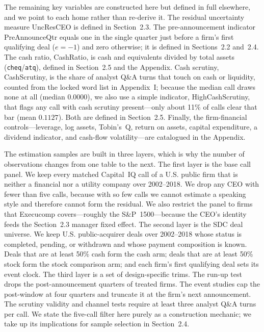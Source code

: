 The remaining key variables are constructed here but defined in full elsewhere, and we point to each home rather than re-derive it. The residual uncertainty measure UncResCEO is defined in Section~2.3. The pre-announcement indicator PreAnnounceQtr equals one in the single quarter just before a firm's first qualifying deal ($e=-1$) and zero otherwise; it is defined in Sections~2.2 and~2.4. The cash ratio, CashRatio, is cash and equivalents divided by total assets (\texttt{cheq}/\texttt{atq}), defined in Section~2.5 and the Appendix. Cash scrutiny, CashScrutiny, is the share of analyst Q\&A turns that touch on cash or liquidity, counted from the locked word list in Appendix~I; because the median call draws none at all (median $0.0000$), we also use a simple indicator, HighCashScrutiny, that flags any call with cash scrutiny present---only about 11\% of calls clear that bar (mean $0.1127$). Both are defined in Section~2.5. Finally, the firm-financial controls---leverage, log assets, Tobin's~Q, return on assets, capital expenditure, a dividend indicator, and cash-flow volatility---are catalogued in the Appendix.

The estimation samples are built in three layers, which is why the number of observations changes from one table to the next. The first layer is the base call panel. We keep every matched Capital~IQ call of a U.S. public firm that is neither a financial nor a utility company over 2002--2018. We drop any CEO with fewer than five calls, because with so few calls we cannot estimate a speaking style and therefore cannot form the residual. We also restrict the panel to firms that Execucomp covers---roughly the S\&P~1500---because the CEO's identity feeds the Section~2.3 manager fixed effect. The second layer is the SDC deal universe. We keep U.S. public-acquirer deals over 2002--2018 whose status is completed, pending, or withdrawn and whose payment composition is known. Deals that are at least 50\% cash form the cash arm; deals that are at least 50\% stock form the stock comparison arm; and each firm's first qualifying deal sets its event clock. The third layer is a set of design-specific trims. The run-up test drops the post-announcement quarters of treated firms. The event studies cap the post-window at four quarters and truncate it at the firm's next announcement. The scrutiny validity and channel tests require at least three analyst Q\&A turns per call. We state the five-call filter here purely as a construction mechanic; we take up its implications for sample selection in Section~2.4.

